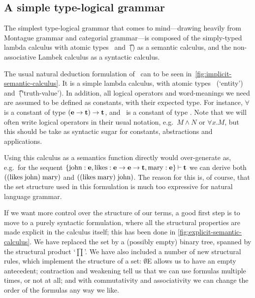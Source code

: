 \subsection{A simple type-logical grammar}
\label{sec:simple-type-logical-grammar}

The simplest type-logical grammar that comes to mind---drawing
heavily from Montague grammar and categorial grammar---is composed of
the simply-typed lambda calculus with atomic types \e\ and \t\ (\lamET) as
a semantic calculus, and the non-associative Lambek calculus
\citep[NL;][]{lambek1961} as a syntactic calculus.

The usual natural deduction formulation of \lamET\ can to be seen
in~\autoref{fig:implicit-semantic-calculus}. It is a simple lambda
calculus, with atomic types \e\ (`entity') and \t\ (`truth-value'). In
addition, all logical operators and word-meanings we need are assumed
to be defined as constants, with their expected type. For instance,
$\forall$ is a constant of type $(\mathbf{e}\rightarrow\mathbf{t})\rightarrow\mathbf{t}$, and \john\ is a
constant of type \e. Note that we will often write logical operators
in their usual notation, e.g.\ $M\land N$ or $\forall x.M$, but this
should be take as syntactic sugar for constants, abstractions and
applications.

%

Using this calculus as a semantics function directly would
over-generate as, e.g.\ for the sequent $\{\text{john}:\mathbf{e},
\text{likes}:\mathbf{e}\rightarrow\mathbf{e}\rightarrow\mathbf{t}, \text{mary}:\mathbf{e}\}\mathbin{\vdash}\mathbf{t}$ we can derive
both $((\text{likes}\;\text{john})\;\text{mary})$ and $((\text{likes}\;\text{mary})\;\text{john})$.
The reason for this is, of course, that the set structure used in this
formulation is much too expressive for natural language grammar.

If we want more control over the structure of our terms, a good first
step is to move to a purely syntactic formulation, where all the
structural properties are made explicit in the calculus itself; this
has been done in \autoref{fig:explicit-semantic-calculus}. We have
replaced the set by a (possibly empty) binary tree, spanned by the
structural product `$\prod$'. We have also included a number of new
structural rules, which implement the structure of a set: $\emptyset$E
allows us to have an empty antecedent; contraction and weakening tell
us that we can use formulas multiple times, or not at all; and with
commutativity and associativity we can change the order of the
formulas any way we like.



